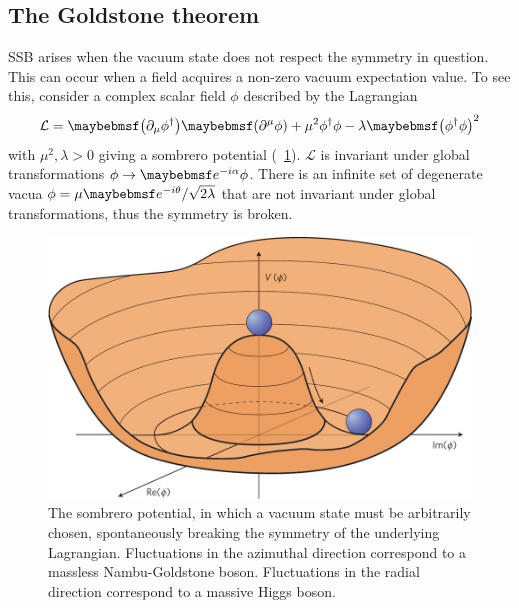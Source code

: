 \subsection{The Goldstone theorem}
\label{sec:ewsb:goldstone}
\ac{SSB} arises when the vacuum state does not respect the symmetry in question. This can 
occur when a field acquires a non-zero vacuum expectation value. To see this, consider a 
complex scalar field $\phi$ described by the Lagrangian
\begin{equation}
	\mathcal{L} 
	= \parenths{\partial_{\mu}\phi^{\dagger}} \parenths{\partial^{\mu}\phi} 
	+ \mu^2 \phi^{\dagger}\phi - \lambda \parenths{\phi^{\dagger}\phi}^2
	\label{eq:lagr:goldstone}
\end{equation}
with $\mu^2, \lambda > 0$ giving a sombrero potential (\Figure~\ref{fig:sombrero}).
$\mathcal{L}$ is invariant under global  transformations $\phi \rightarrow 
\eexp{-i\alpha} \phi$. There is an infinite set of degenerate vacua
$\phi = \mu\eexp{-i\theta}/\sqrt{2\lambda}$ that are not invariant under 
global  transformations, thus the symmetry is broken.

\begin{figure}
	\includegraphics[width=\mediumfigwidth]{tex/motivation/sombrero}
	\caption{The sombrero potential, in which a vacuum state must be arbitrarily chosen, 
	spontaneously breaking the symmetry of the underlying Lagrangian.
	Fluctuations in the azimuthal direction correspond to a massless Nambu-Goldstone 
	boson. Fluctuations in the radial direction correspond to a massive Higgs boson.}
	\label{fig:sombrero}
\end{figure}

